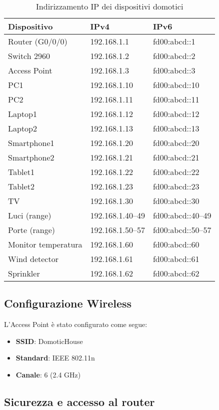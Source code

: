 \documentclass[a4paper,12pt]{article}
\begin{document}
\begin{table}[H]
\centering
\begin{tabular}{|l|l|l|}
\hline
\textbf{Dispositivo} & \textbf{IPv4} & \textbf{IPv6} \\
\hline
Router (G0/0/0) & 192.168.1.1 & fd00:abcd::1 \\
Switch 2960 & 192.168.1.2 & fd00:abcd::2 \\
Access Point & 192.168.1.3 & fd00:abcd::3 \\
PC1 & 192.168.1.10 & fd00:abcd::10 \\
PC2 & 192.168.1.11 & fd00:abcd::11 \\
Laptop1 & 192.168.1.12 & fd00:abcd::12 \\
Laptop2 & 192.168.1.13 & fd00:abcd::13 \\
Smartphone1 & 192.168.1.20 & fd00:abcd::20 \\
Smartphone2 & 192.168.1.21 & fd00:abcd::21 \\
Tablet1 & 192.168.1.22 & fd00:abcd::22 \\
Tablet2 & 192.168.1.23 & fd00:abcd::23 \\
TV & 192.168.1.30 & fd00:abcd::30 \\
Luci (range) & 192.168.1.40–49 & fd00:abcd::40–49 \\
Porte (range) & 192.168.1.50–57 & fd00:abcd::50–57 \\
Monitor temperatura & 192.168.1.60 & fd00:abcd::60 \\
Wind detector & 192.168.1.61 & fd00:abcd::61 \\
Sprinkler & 192.168.1.62 & fd00:abcd::62 \\
\hline
\end{tabular}
\caption{Indirizzamento IP dei dispositivi domotici}
\end{table}

\subsection{Configurazione Wireless}

L’Access Point è stato configurato come segue:

\begin{itemize}
    \item \textbf{SSID}: DomoticHouse
    \item \textbf{Standard}: IEEE 802.11n
    \item \textbf{Canale}: 6 (2.4 GHz)
\end{itemize}
\subsection{Sicurezza e accesso al router}
\end{document}
